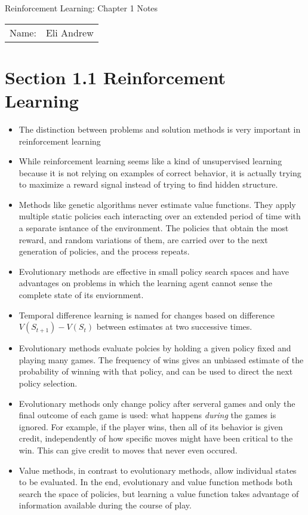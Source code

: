 \documentclass[12pt]{article}
\begin{document}
\begin{center}
{\Large Reinforcement Learning: Chapter 1 Notes}

\begin{tabular}{rl}
Name: & Eli Andrew
\end{tabular}
\end{center}

\section*{Section 1.1 Reinforcement Learning}

  \begin{itemize}
    \item The distinction between problems and solution methods is very
    important in reinforcement learning
    \item While reinforcement learning seems like a kind of unsupervised learning
    because it is not relying on examples of correct behavior, it is actually trying
    to maximize a reward signal instead of trying to find hidden structure.
    \item Methods like genetic algorithms never estimate value functions. They apply
    multiple static policies each interacting over an extended period of time with a
    separate isntance of the environment. The policies that obtain the most reward,
    and random variations of them, are carried over to the next generation of policies,
    and the process repeats.
    \item Evolutionary methods are effective in small policy search spaces and have advantages
    on problems in which the learning agent cannot sense the complete state of its enviornment.
    \item Temporal difference learning is named for changes based on difference $V(S_{t+1}) - V(S_t)$
    between estimates at two successive times.
    \item Evolutionary methods evaluate polcies by holding a given policy fixed and playing many games.
    The frequency of wins gives an unbiased estimate of the probability of winning with that policy, and
    can be used to direct the next policy selection.
    \item Evolutionary methods only change policy after serveral games and only the final outcome of each
    game is used: what happens \textit{during} the games is ignored. For example, if the player wins,
    then all of its behavior is given credit, independently of how specific moves might have been critical
    to the win. This can give credit to moves that never even occured.
    \item Value methods, in contrast to evolutionary methods, allow individual states to be evaluated. In the
    end, evolutionary and value function methods both search the space of policies, but learning a value function
    takes advantage of information available during the course of play.
  \end{itemize}
\end{document}
